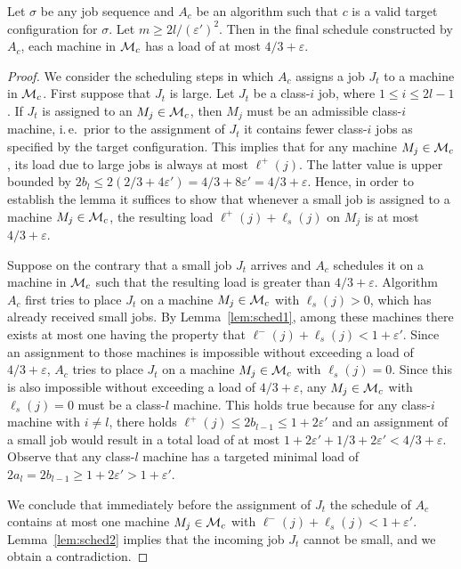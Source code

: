 \documentclass{llncs}
\newcommand{\eps}{\varepsilon}
\begin{document}
\begin{lemma}\label{lem:sched3}
Let $\sigma$ be any job sequence and $A_c$ be an algorithm such that $c$ is a valid target configuration for
$\sigma$. Let $m \geq 2l/(\eps')^2$. Then in the final schedule constructed by $A_c$, each machine in 
${\cal M}_c$ has a load of at most $4/3 +\eps$. 
\end{lemma}
\begin{proof}
We consider the scheduling steps in which $A_c$ assigns a job $J_t$ to a machine in ${\cal M}_c$. First suppose 
that $J_t$ is large. Let $J_t$ be a class-$i$ job, where $1\leq i \leq 2l-1$. If $J_t$ is assigned to an 
$M_j \in {\cal M}_c$, then $M_j$ must be an admissible class-$i$ machine, i.\,e.\ prior to the assignment of $J_t$ 
it contains fewer class-$i$ jobs as specified by the target configuration. This implies that for any machine
$M_j \in {\cal M}_c$, its load due to large jobs is always at most $\ell^+(j)$. The latter value is upper
bounded by $2b_l \leq 2(2/3+4\eps') = 4/3 + 8\eps' = 4/3+\eps$. Hence, in order to establish the lemma it
suffices to show that whenever a small job is assigned to a machine $M_j \in {\cal M}_c$, the resulting
load $\ell^+(j) + \ell_s(j)$ on $M_j$ is at most $4/3+\eps$.

Suppose on the contrary that a small job $J_t$ arrives and $A_c$ schedules it on a machine in ${\cal M}_c$
such that the resulting load is greater than $4/3+\eps$. Algorithm $A_c$ first tries to place $J_t$ on a 
machine $M_j \in {\cal M}_c$ with $\ell_s(j) >0$, which has already received small jobs. By Lemma~\ref{lem:sched1},
among these machines there exists at most one having the property that $\ell^-(j) + \ell_s(j) < 1+\eps'$. 
Since an assignment to those machines is impossible without exceeding a load of $4/3+\eps$, $A_c$
tries to place $J_t$ on a machine $M_j\in {\cal M}_c$ with $\ell_s(j) =0$. Since this is also impossible
without exceeding a load of $4/3+\eps$, any $M_j\in {\cal M}_c$ with $\ell_s(j)=0$ must be a class-$l$
machine. This holds true because for any class-$i$ machine with $i\neq l$, there holds $\ell^+(j) \leq 2b_{l-1}
\leq 1+2\eps'$ and an assignment of a small job would result in a total load of at most 
$1+2\eps' + 1/3 + 2\eps' < 4/3+\eps$. Observe that any class-$l$ machine has a targeted minimal load of
$2a_l = 2b_{l-1} \geq 1+2\eps' > 1+\eps'$. 

We conclude that immediately before the assignment of $J_t$ the schedule of $A_c$ contains at most one
machine $M_j \in {\cal M}_c$ with $\ell^-(j) + \ell_s(j) < 1+\eps'$. Lemma~\ref{lem:sched2} implies 
that the incoming job $J_t$ cannot be small, and we obtain a contradiction. \hspace*{\fill}{$\Box$}
\end{proof}
\end{document}
